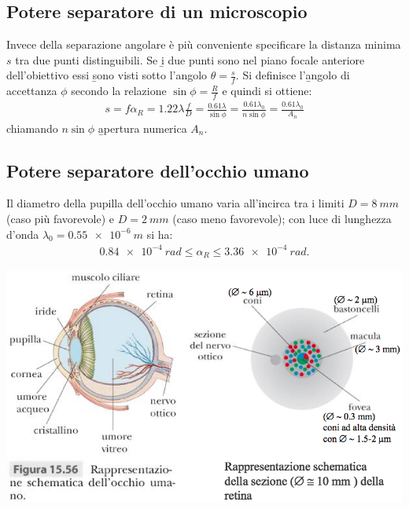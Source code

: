 \subsection{Potere separatore di un microscopio}
Invece della separazione angolare è più conveniente specificare la distanza minima $s$ tra due punti distinguibili. Se \b{i due punti sono nel piano focale anteriore dell'obiettivo} essi \b{sono visti sotto l'angolo $\theta=\frac{s}{f}$}. Si definisce l'\b{angolo di accettanza $\phi$} secondo la relazione $\sin{\phi}=\frac{R}{f}$ e quindi si ottiene:
\begin{equation}\begin{split}
s=f\alpha_R=1.22\lambda\frac{f}{D}=\frac{0.61\lambda}{\sin{\phi}}=\frac{0.61\lambda_0}{n\sin{\phi}}=\frac{0.61\lambda_0}{A_n}
\end{split}\end{equation}
chiamando $n\sin{\phi}$ \b{apertura numerica $A_n$}.

\subsection{Potere separatore dell'occhio umano}
Il diametro della pupilla dell'occhio umano varia all'incirca tra i limiti $D=\SI{8}{mm}$ (caso più favorevole) e $D=\SI{2}{mm}$ (caso meno favorevole); con luce di lunghezza d'onda $\lambda_0=\SI{0.55e-6}{m}$ si ha:
\begin{equation}\begin{split}
\SI{0.84e-4}{rad}\le\alpha_R\le\SI{3.36e-4}{rad}.
\end{split}\end{equation}

\begin{center}
\includegraphics[width=\textwidth]{immagini/occhio.png}
\end{center}

